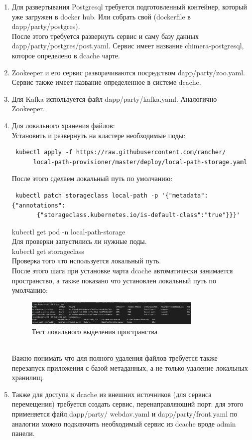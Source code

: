 \documentclass{article}
\begin{document}
\begin{enumerate}
   \item Для развертывания Postgresql требуется подготовленный контейнер, который уже загружен в docker hub. Или собрать свой (dockerfile в dapp/party/postgres).\\
   После этого требуется развернуть сервис и саму базу данных dapp/party/postgres/post.yaml. Сервис имеет название chimera-postgresql, которое определено в dcache чарте.
   \item Zookeeper и его сервис разворачиваются посредством dapp/party/zoo.yaml. Сервис также имеет название определенное в системе dcache. 
   \item Для Kafka используется файл dapp/party/kafka.yaml. Аналогично Zookeeper.
   \item Для локального хранения файлов:\\
   Установить и развернуть на кластере необходимые поды: \\
   \begin{verbatim} kubectl apply -f https://raw.githubusercontent.com/rancher/
      local-path-provisioner/master/deploy/local-path-storage.yaml \end{verbatim}
   После этого сделаем локальный путь по умолчанию: \begin{verbatim} kubectl patch storageclass local-path -p '{"metadata": {"annotations":
       {"storageclass.kubernetes.io/is-default-class":"true"}}}' \end{verbatim}
   {\selectfont kubectl get pod -n local-path-storage}\\
   Для проверки запустились ли нужные поды.\\
   {\selectfont kubectl get storageclass}\\
   Проверка того что используется локальный путь.\\
   После этого шага при установке чарта dcache автоматически занимается пространство, а также показано что установлен локальный путь по умолчанию:
   \begin{figure}[h]
      \centering
      \includegraphics[width=0.8\textwidth]{images/pvc.png}
      \caption{Тест локального выделения пространства}
   \end{figure}\\
   Важно понимать что для полного удаления файлов требуется также перезапуск приложения с базой метаданных, а не только удаление локальных хранилищ.
   \item Также для доступа к dcache из внешних источников (для сервиса перемещения) требуется создать сервис, перенаправляющий порт:
   для этого применяется файл dapp/party/ webdav.yaml и dapp/party/front.yaml по аналогии можно подключить необходимый сервис из dcache вроде admin панели.
\end{enumerate}
\end{document}
